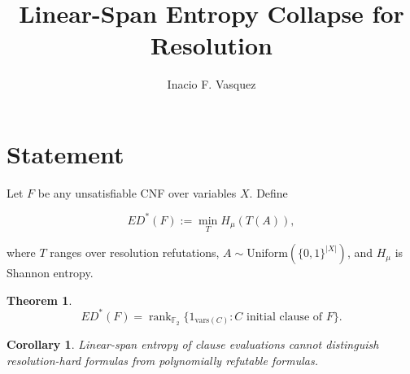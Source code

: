 \documentclass[11pt]{article}
\title{Linear-Span Entropy Collapse for Resolution}
\author{Inacio F. Vasquez}
\date{}
\newtheorem{theorem}{Theorem}
\newtheorem{corollary}{Corollary}
\begin{document}
\maketitle

\section*{Statement}

Let $F$ be any unsatisfiable CNF over variables $X$.
Define

\[
ED^*(F) := \min_T H_\mu(T(A)),
\]

where $T$ ranges over resolution refutations,
$A \sim \mathrm{Uniform}(\{0,1\}^{|X|})$,
and $H_\mu$ is Shannon entropy.

\begin{theorem}
\[
ED^*(F)
=
\operatorname{rank}_{\mathbb F_2}
\{1_{\mathrm{vars}(C)} : C \text{ initial clause of } F\}.
\]
\end{theorem}

\begin{corollary}
Linear-span entropy of clause evaluations
cannot distinguish resolution-hard formulas
from polynomially refutable formulas.
\end{corollary}
\end{document}
